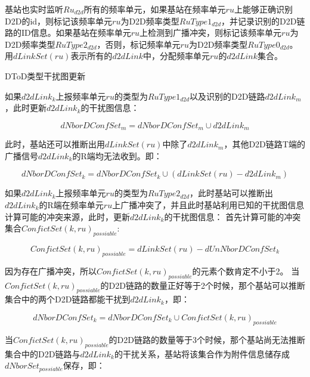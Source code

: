 \documentclass[figurelist,tablelist,algorithmlist,nomlist,masters]{seuthesix}
\begin{document}
\begin{enumerate}
	基站也实时监听$R{u_{d2d}}$所有的频率单元，如果基站在频率单元$ru$上能够正确识别D2D的id，则标记该频率单元$ru$为D2D频率类型$RuType{1_{d2d}}$，并记录识别的D2D链路的ID信息。如果基站在频率单元$ru$上检测到广播冲突，则标记该频率单元$ru$为D2D频率类型$RuType{2_{d2d}}$，否则，标记频率单元$ru$为D2D频率类型$RuType{0_{d2d}}$。
	用$dLinkSet(ru)$表示所有的$d2dLink$中，分配频率单元$ru$的$d2dLink$集合。
	
	
	DToD类型干扰图更新
	
	如果$d2dLin{k_k}$上报频率单元$ru$的类型为$RuType{1_{d2d}}$以及识别的D2D链路$d2dLin{k_m}$，此时更新$d2dLin{k_k}$的干扰图信息：
	
	\begin{equation}\label{eq2.1}
	dNborDConfSe{t_m} = dNborDConfSe{t_m} \cup d2dLin{k_m}
	\end{equation}
	
	此时，基站还可以推断出用$dLinkSet(ru)$中除了$d2dLin{k_m}$，其他D2D链路T端的广播信号$d2dLin{k_k}$的R端均无法收到。即：
	
	\begin{equation}\label{eq2.1}
	dNborDConfSe{t_k} = dNborDConfSe{t_k} \cup (dLinkSet(ru) - d2dLin{k_m})
	\end{equation}
	
	
	
	如果$d2dLin{k_k}$上报频率单元$ru$的类型为$RuType{2_{d2d}}$，此时基站可以推断出$d2dLin{k_k}$的R端在频率单元$ru$上广播冲突了，并且此时基站利用已知的干扰图信息计算可能的冲突来源，此时，更新$d2dLin{k_k}$的干扰图信息：
	首先计算可能的冲突集合$ConfictSet{(k,ru)_{possiable}}$:
	
	\begin{equation}\label{eq2.1}
	ConfictSet{(k,ru)_{possiable}} = dLinkSet(ru) - dUnNborDConfSe{t_k}
	\end{equation}
	
	因为存在广播冲突，所以$ConfictSet{(k,ru)_{possiable}}$的元素个数肯定不小于2。
	当$ConfictSet{(k,ru)_{possiable}}$的D2D链路的数量正好等于2个时候，那个基站可以推断集合中的两个D2D链路都能干扰到$d2dLin{k_k}$，即：
	
	\begin{equation}\label{eq2.1}
	dNborDConfSe{t_k} = dNborDConfSe{t_k} \cup ConfictSet{(k,ru)_{possiable}}
	\end{equation}
	
	当$ConfictSet{(k,ru)_{possiable}}$的D2D链路的数量等于3个时候，那个基站尚无法推断集合中的D2D链路与$d2dLin{k_k}$的干扰关系，基站将该集合作为附件信息储存成$dNborSe{t_{possiable}}$保存，即：
	

\end{enumerate}
\end{document}
